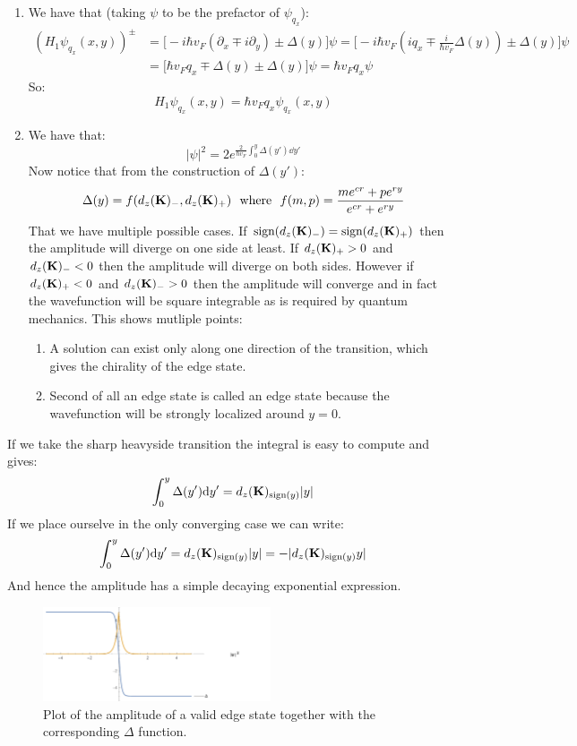\documentclass[10pt,a4paper]{article}
\begin{document}
\begin{enumerate}
\item We have that (taking $\psi$ to be the prefactor of $\psi_{q_x}$):
\begin{align*}
(H_1 \psi_{q_x}(x, y))^{\pm} &= \Big[- i \hbar v_F (\partial_x \mp i \partial_y) \pm \Delta(y)\Big] \psi = \Big[- i \hbar v_F(iq_x \mp \frac{i}{\hbar v_F} \Delta(y)) \pm \Delta(y)\Big]\psi\\
&= \Big[ \hbar v_F q_x \mp  \Delta(y) \pm \Delta(y) \Big] \psi = \hbar v_F q_x \psi
\end{align*}
So:
\[
H_1 \psi_{q_x}(x,y) = \hbar v_F q_x \psi_{q_x}(x, y)
\]

\item We have that:
\[
|\psi|^2 = 2e^{\frac{2}{\hbar v_F} \int_0^y \Delta(y') \dd y'}
\]
Now notice that from the construction of $\Delta(y')$:
\[
\Delta(y) = f(d_z(\vb{K})_-, d_z(\vb{K})_+) \mbox{~~where~~} f(m, p) = \frac{m e^{cr} + p e^{ry}}{e^{cr} + e^{ry}}
\]
That we have multiple possible cases. If $\text{sign}(d_z(\vb{K})_-) = \text{sign}(d_z(\vb{K})_+)$ then the amplitude will diverge on one side at least. If $d_z(\vb{K})_+ > 0$ and $d_z(\vb{K})_- < 0$ then the amplitude will diverge on both sides. However if $d_z(\vb{K})_+ < 0$ and $d_z(\vb{K})_- > 0$ then the amplitude will converge and in fact the wavefunction will be square integrable as is required by quantum mechanics. This shows mutliple points:
\begin{enumerate}
\item A solution can exist only along one direction of the transition, which gives the chirality of the edge state.
\item Second of all an edge state is called an edge state because the wavefunction will be strongly localized around $y = 0$.
\end{enumerate}
\end{enumerate}
If we take the sharp heavyside transition the integral is easy to compute and gives:
\[
\int_0^y \Delta(y') \dd y' = d_z(\vb{K})_{\text{sign}(y)} |y|
\]
If we place ourselve in the only converging case we can write:
\[
\int_0^y \Delta(y') \dd y' = d_z(\vb{K})_{\text{sign}(y)} |y| = - |d_z(\vb{K})_{\text{sign}(y)} y| 
\]
And hence the amplitude has a simple decaying exponential expression.

\begin{figure}
\centering
\includegraphics[width=0.6\textwidth]{edgestate}
\caption{Plot of the amplitude of a valid edge state together with the corresponding $\Delta$ function.}
\end{figure}
\end{document}
